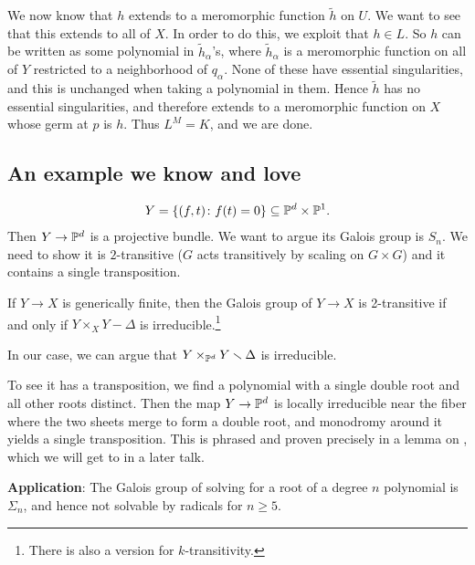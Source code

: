 \documentclass[11pt]{amsart}
\let\til\widetilde
\begin{document}
We now know that $h$ extends to a meromorphic function $\til{h}$ on $U$. We want to see that this extends to all of $X$. In order to do this, we exploit that $h \in L$. So $h$ can be written as some polynomial in $\til{h}_\alpha$'s, where $\til{h}_\alpha$ is a meromorphic function on all of $Y$ restricted to a neighborhood of $q_\alpha$. None of these have essential singularities, and this is unchanged when taking a polynomial in them. Hence $\til{h}$ has no essential singularities, and therefore extends to a meromorphic function on $X$ whose germ at $p$ is $h$. Thus $L^M = K$, and we are done.

\subsection{An example we know and love}


\begin{align*}
    Y = \left\{ (f,t) \colon f(t) = 0 \right\} \subseteq \P^d \times \P^1.
\end{align*}
Then $Y \to \P^d$ is a projective bundle. We want to argue its Galois group is $S_n$. We need to show it is $2$-transitive ($G$ acts transitively by scaling on $G \times G$) and it contains a single transposition.

\begin{proposition} If $Y \to X$ is generically finite, then the Galois group of $Y \to X$ is 2-transitive if and only if $Y \times_X Y \minus \Delta$ is irreducible.\footnote{There is also a version for $k$-transitivity.} 
\end{proposition}

In our case, we can argue that $Y \times_{\P^d} Y\minus\Delta$ is irreducible.

To see it has a transposition, we find a polynomial with a single double root and all other roots distinct. Then the map $Y \to \P^d$ is locally irreducible near the fiber where the two sheets merge to form a double root, and monodromy around it yields a single transposition. This is phrased and proven precisely in a lemma on \cite[p.~698]{Harris-Galois}, which we will get to in a later talk.

\textbf{Application}: The Galois group of solving for a root of a degree $n$ polynomial is $\Sigma_n$, and hence not solvable by radicals for $n\ge 5$.






\printbibliography
\end{document}
